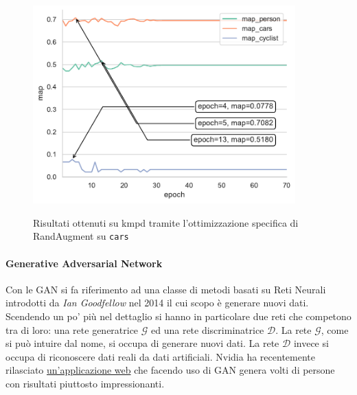 \begin{figure}[]
\begin{minipage}{.5\linewidth}
{            \includegraphics[width =0.90\textwidth]{images/graphic/graphics_map_ra_cars.pdf}
        }
    \end{minipage}%
    \centering
    \caption{Risultati ottenuti su \ac{kmpd} tramite l'ottimizzazione specifica di RandAugment su \texttt{cars}}
    \label{fig:RA_3}
\end{figure}


\paragraph{Generative Adversarial Network}
Con le \acf{GAN} si fa riferimento ad una classe di metodi basati su Reti Neurali introdotti da \textit{Ian Goodfellow} \cite{goodfellow2014generative} nel 2014 il cui scopo è generare nuovi dati. Scendendo un po' più nel dettaglio si hanno in particolare due reti che competono tra di loro: una rete generatrice $\mathcal{G}$ ed una rete discriminatrice $\mathcal{D}$. La rete $\mathcal{G}$, come si può intuire dal nome, si occupa di generare nuovi dati. La rete $\mathcal{D}$ invece si occupa di riconoscere dati reali da dati artificiali. Nvidia ha recentemente rilasciato \href{https://www.thispersondoesnotexist.com/}{un'applicazione web} \cite{Karras2019stylegan2} che facendo uso di \ac{GAN} genera volti di persone con risultati piuttosto impressionanti. 

